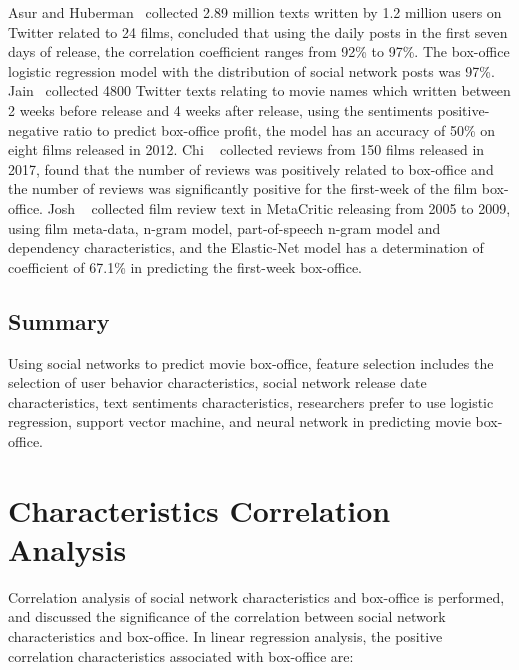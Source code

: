 \documentclass[review]{cvpr}
\begin{document}
  Asur and Huberman~\cite{asur2010predicting} collected 2.89 million texts written by 1.2 million users on Twitter related to 24 films,
  concluded that using the daily posts in the first seven days of release, the correlation coefficient ranges from 92\% to 97\%.
  The box-office logistic regression model with the distribution of social network posts was 97\%.
  Jain~\cite{jain2013prediction} collected 4800 Twitter texts relating to movie names which written between 2 weeks before release and 4 weeks after release,
  using the sentiments positive-negative ratio to predict box-office profit, the model has an accuracy of 50\% on eight films released in 2012.
  Chi \etal~\cite{chi2019does} collected reviews from 150 films released in 2017, found that the number of reviews was positively related to box-office
  and the number of reviews was significantly positive for the first-week of the film box-office.
  Josh \etal~\cite{joshi2010movie} collected film review text in MetaCritic releasing from 2005 to 2009, using film meta-data, n-gram model,
  part-of-speech n-gram model and dependency characteristics, and the Elastic-Net model has a determination of coefficient of 67.1\% in predicting the first-week box-office.

\subsection{Summary}

  Using social networks to predict movie box-office, feature selection includes the selection of user behavior characteristics,
  social network release date characteristics, text sentiments characteristics,
  researchers prefer to use logistic regression, support vector machine, and neural network in predicting movie box-office.


\section{Characteristics Correlation Analysis}

  Correlation analysis of social network characteristics and box-office is performed,
  and discussed the significance of the correlation between social network characteristics and box-office.
  In linear regression analysis, the positive correlation characteristics associated with box-office are:
\end{document}
